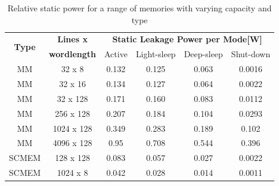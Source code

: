 \documentclass[smallextended]{svjour3}
\begin{document}
\begin{table}
	\caption{Relative static power for a range of memories with varying capacity and type}
	\label{tab:rel2}
	\begin{tabular}{|c|c|c|c|c|c|}
		\hline
		\multirow{2}{*}{\textbf{Type}} & \textbf{Lines x} & \multicolumn{4}{c|}{\textbf{Static Leakage Power per Mode[W]}} \\ \cline{3-6}
		& \textbf{wordlength} & Active & Light-sleep & Deep-sleep & Shut-down\\ 
		\hline 
		MM & 32 x 8 & 0.132 & 0.125 & 0.063 & 0.0016\\ 
		\hline
		MM & 32 x 16 & 0.134 & 0.127 & 0.064 & 0.0022\\ 
		\hline
		MM & 32 x 128 & 0.171 & 0.160 & 0.083 & 0.0112\\ 
		\hline
		MM & 256 x 128 & 0.207 & 0.184 & 0.104 & 0.0293\\ 
		\hline
		MM & 1024 x 128 & 0.349 & 0.283 & 0.189 & 0.102\\ 
		\hline
		MM & 4096 x 128 & 0.95 & 0.708 & 0.544 & 0.396\\ 
		\hline
		SCMEM & 128 x 128 & 0.083 & 0.057 & 0.027 & 0.0022\\ 
		\hline
		SCMEM & 1024 x 8 & 0.042 &
		 0.028 & 0.014 & 0.0011\\ 
		\hline
	\end{tabular}
\end{table}
\end{document}
